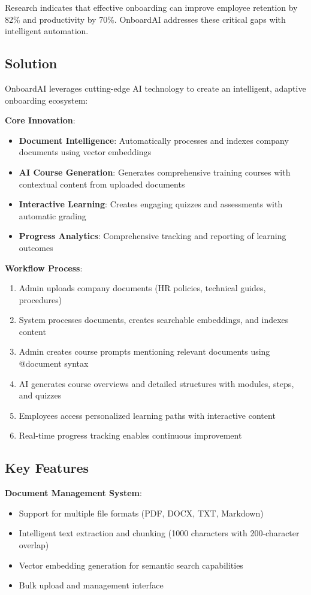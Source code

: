 \documentclass[a4paper,11pt]{article}
\begin{document}
Research indicates that effective onboarding can improve employee retention by 82\% and productivity by 70\%. OnboardAI addresses these critical gaps with intelligent automation.

\subsection{Solution}

OnboardAI leverages cutting-edge AI technology to create an intelligent, adaptive onboarding ecosystem:

\textbf{Core Innovation}:
\begin{itemize}
    \item \textbf{Document Intelligence}: Automatically processes and indexes company documents using vector embeddings
    \item \textbf{AI Course Generation}: Generates comprehensive training courses with contextual content from uploaded documents
    \item \textbf{Interactive Learning}: Creates engaging quizzes and assessments with automatic grading
    \item \textbf{Progress Analytics}: Comprehensive tracking and reporting of learning outcomes
\end{itemize}

\textbf{Workflow Process}:
\begin{enumerate}
    \item Admin uploads company documents (HR policies, technical guides, procedures)
    \item System processes documents, creates searchable embeddings, and indexes content
    \item Admin creates course prompts mentioning relevant documents using @document syntax
    \item AI generates course overviews and detailed structures with modules, steps, and quizzes
    \item Employees access personalized learning paths with interactive content
    \item Real-time progress tracking enables continuous improvement
\end{enumerate}

\subsection{Key Features}

\textbf{Document Management System}:
\begin{itemize}
    \item Support for multiple file formats (PDF, DOCX, TXT, Markdown)
    \item Intelligent text extraction and chunking (1000 characters with 200-character overlap)
    \item Vector embedding generation for semantic search capabilities
    \item Bulk upload and management interface
\end{itemize}
\end{document}

